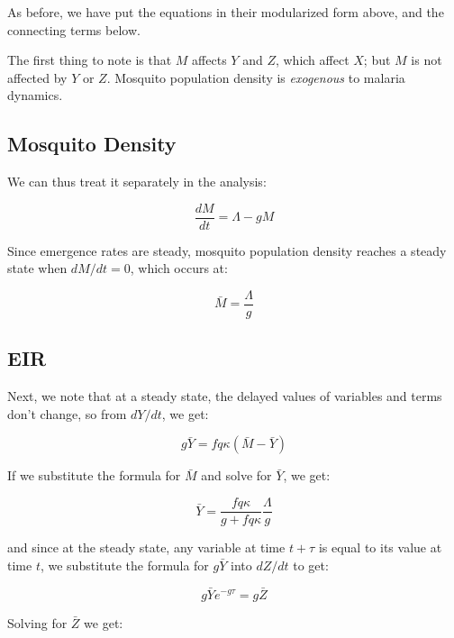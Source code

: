 \documentclass[
]{book}
\begin{document}
As before, we have put the equations in their modularized form above, and the connecting terms below.

The first thing to note is that \(M\) affects \(Y\) and \(Z\), which affect \(X\); but \(M\) is not affected by \(Y\) or \(Z\). Mosquito population density is \emph{exogenous} to malaria dynamics.

\subsection{Mosquito Density}\label{mosquito-density}

We can thus treat it separately in the analysis:

\begin{equation}
\frac{dM}{dt} = \Lambda - g M 
\end{equation}

Since emergence rates are steady, mosquito population density reaches a steady state when \(dM/dt=0\), which occurs at:

\begin{equation}
\bar M = \frac{\Lambda}{g} 
\end{equation}

\subsection{EIR}\label{eir}

Next, we note that at a steady state, the delayed values of variables and terms don't change, so from \(dY/dt\), we get:

\begin{equation}
g \bar Y = fq\kappa(\bar M- \bar Y) 
\end{equation}

If we substitute the formula for \(\bar M\) and solve for \(\bar Y\), we get:

\begin{equation}
\bar Y = \frac{fq\kappa}{g + fq\kappa} \frac{\Lambda}{g}
\end{equation}

and since at the steady state, any variable at time \(t+\tau\) is equal to its value at time \(t\), we substitute the formula for \(g \bar Y\) into \(dZ/dt\) to get:

\begin{equation}
g \bar Y e^{-g\tau} = g \bar Z
\end{equation}

Solving for \(\bar Z\) we get:
\end{document}
